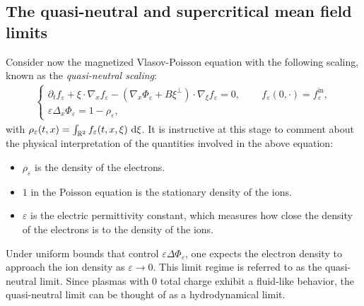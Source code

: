 \documentclass[11pt,reqno]{amsart}
\numberwithin{equation}{section}
\def\dd{{\rm d}}
\begin{document}
\subsection{The quasi-neutral and supercritical mean field limits}
Consider now the magnetized Vlasov-Poisson equation with the following scaling, known as the \textit{quasi-neutral scaling}:
\begin{align}\tag{VPB$\varepsilon$}
\begin{cases}
\partial_{t}f_{\varepsilon}+\xi\cdot \nabla_{x}f_{\varepsilon}-(\nabla_{x}\Phi_{\varepsilon}+ B\xi^{\perp})\cdot\nabla_{\xi} f_{\varepsilon}=0, \qquad\, f_{\varepsilon}(0,\cdot)=f^{\mathrm{in}}_{\varepsilon},\\
\varepsilon\Delta_{x} \Phi_{\varepsilon}=1-\rho_{\varepsilon},
\end{cases}
\label{magnetized vp with quasineutral scaling}
\end{align}
with $\rho_{\varepsilon}(t,x)=\int_{\mathbb{R}^{2}} f_{\varepsilon}(t,x,\xi)\ \dd \xi$. 
It is instructive at this stage to comment about the physical interpretation of the quantities involved in the above equation:
\begin{itemize}
     \item[{\rm(i)}] $\rho_{\varepsilon}$ is the density of  the electrons. 
   \item[{\rm(ii)}] $1$ in the Poisson equation
   is the stationary density of the ions. 
   \item[{\rm(iii)}] $\varepsilon$ is the electric permittivity constant, which measures how close the density of the electrons is to the density of the ions.  
\end{itemize}
Under uniform bounds that control $\varepsilon\Delta\Phi_\varepsilon$, one expects the electron density to approach the ion density as $\varepsilon\to0$. This limit regime is referred to as the quasi-neutral limit. 
Since plasmas with $0$ total charge exhibit a fluid-like behavior, 
the quasi-neutral limit can be thought of as a hydrodynamical limit. 
\end{document}
